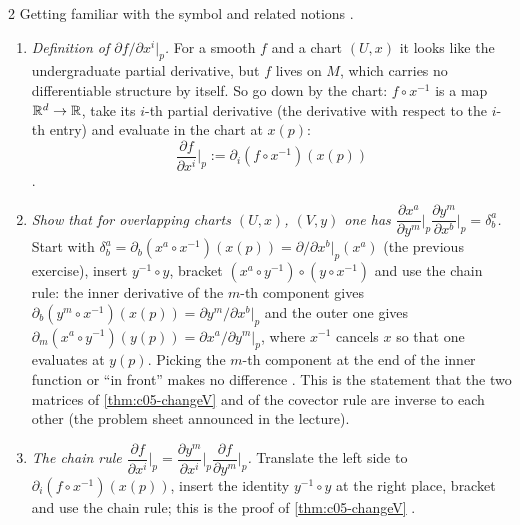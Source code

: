 \begin{paracol}{2}
Getting familiar with the symbol and related notions .
\begin{enumerate}
  \item \emph{Definition of $\partial f/\partial x^i|_p$.} For a smooth $f$ and a chart $(U,x)$ it looks like the undergraduate partial derivative, but $f$ lives on $M$, which carries no differentiable structure by itself. So go down by the chart: $f\circ x^{-1}$ is a map $\mathbb{R}^d\to\mathbb{R}$, take its $i$-th partial derivative (the derivative with respect to the $i$-th entry) and evaluate in the chart at $x(p)$:
        \[
          \frac{\partial f}{\partial x^i}\Big|_p:=\partial_i(f\circ x^{-1})(x(p))
        \]
        .
  \item \emph{Show that for overlapping charts $(U,x)$, $(V,y)$ one has $\dfrac{\partial x^a}{\partial y^m}\Big|_p\dfrac{\partial y^m}{\partial x^b}\Big|_p=\delta^a_b$.} Start with $\delta^a_b=\partial_b(x^a\circ x^{-1})(x(p))=\partial/\partial x^b|_p(x^a)$ (the previous exercise), insert $y^{-1}\circ y$, bracket $(x^a\circ y^{-1})\circ(y\circ x^{-1})$ and use the chain rule: the inner derivative of the $m$-th component gives
        $\partial_b(y^m\circ x^{-1})(x(p))=\partial y^m/\partial x^b|_p$ and the outer one gives $\partial_m(x^a\circ y^{-1})(y(p))=\partial x^a/\partial y^m|_p$, where $x^{-1}$ cancels $x$ so that one evaluates at $y(p)$. Picking the $m$-th component at the end of the inner function or ``in front'' makes no difference
        .
        This is the statement that the two matrices of \cref{thm:c05-changeV} and of the covector rule are inverse to each other (the problem sheet announced in the lecture).
  \item \emph{The chain rule $\dfrac{\partial f}{\partial x^i}\Big|_p=\dfrac{\partial y^m}{\partial x^i}\Big|_p\dfrac{\partial f}{\partial y^m}\Big|_p$.} Translate the left side to $\partial_i(f\circ x^{-1})(x(p))$, insert the identity $y^{-1}\circ y$ at the right place, bracket and use the chain rule; this is the proof of \cref{thm:c05-changeV} .

\end{enumerate}
\end{paracol}
